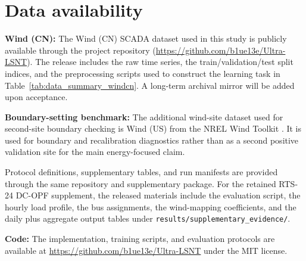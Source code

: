 \documentclass[review,1p,times]{elsarticle}
\begin{document}
\section*{Data availability}
\textbf{Wind (CN):} The Wind (CN) SCADA dataset used in this study is publicly available through the project repository (\url{https://github.com/b1ue13e/Ultra-LSNT}). The release includes the raw time series, the train/validation/test split indices, and the preprocessing scripts used to construct the learning task in Table~\ref{tab:data_summary_windcn}. A long-term archival mirror will be added upon acceptance.

\textbf{Boundary-setting benchmark:} The additional wind-site dataset used for second-site boundary checking is Wind (US) from the NREL Wind Toolkit \cite{draxl2015windtoolkit}. It is used for boundary and recalibration diagnostics rather than as a second positive validation site for the main energy-focused claim.

Protocol definitions, supplementary tables, and run manifests are provided through the same repository and supplementary package. For the retained RTS-24 DC-OPF supplement, the released materials include the evaluation script, the hourly load profile, the bus assignments, the wind-mapping coefficients, and the daily plus aggregate output tables under \texttt{results/supplementary\_evidence/}.

\textbf{Code:} The implementation, training scripts, and evaluation protocols are available at \url{https://github.com/b1ue13e/Ultra-LSNT} under the MIT license.

\appendix
\end{document}
